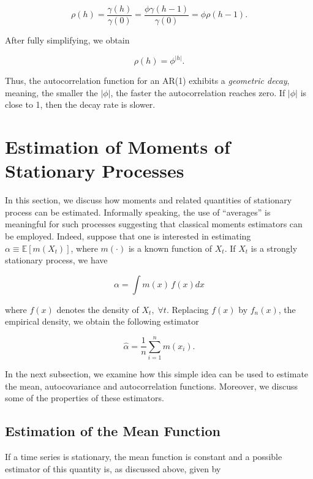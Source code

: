 \documentclass[]{book}
\theoremstyle{definition}
\theoremstyle{definition}
\theoremstyle{definition}
\theoremstyle{remark}
\begin{document}
\[\rho \left( h \right) = \frac{{\gamma \left( h \right)}}{{\gamma \left( 0 \right)}} = \frac{{\phi \gamma \left( {h - 1} \right)}}{{\gamma \left( 0 \right)}} = \phi \rho \left( {h - 1} \right).\]

After fully simplifying, we obtain

\[\rho \left( h \right) = {\phi^{|h|}}.\]

Thus, the autocorrelation function for an AR(1) exhibits a
\emph{geometric decay}, meaning, the smaller the \(|\phi|\), the faster
the autocorrelation reaches zero. If \(|\phi|\) is close to 1, then the
decay rate is slower.

\hypertarget{estimation-of-moments-of-stationary-processes}{%
\section{Estimation of Moments of Stationary
Processes}\label{estimation-of-moments-of-stationary-processes}}

In this section, we discuss how moments and related quantities of
stationary process can be estimated. Informally speaking, the use of
``averages'' is meaningful for such processes suggesting that classical
moments estimators can be employed. Indeed, suppose that one is
interested in estimating \(\alpha \equiv \mathbb{E}[m (X_t)]\), where
\(m(\cdot)\) is a known function of \(X_t\). If \(X_t\) is a strongly
stationary process, we have

\[\alpha = \int m(x) \, f(x) dx\]

where \(f(x)\) denotes the density of \(X_t, \; \forall t\). Replacing
\(f(x)\) by \(f_n(x)\), the empirical density, we obtain the following
estimator

\[\hat{\alpha} = \frac{1}{n} \sum_{i = 1}^n m\left(x_i\right).\]

In the next subsection, we examine how this simple idea can be used to
estimate the mean, autocovariance and autocorrelation functions.
Moreover, we discuss some of the properties of these estimators.

\hypertarget{estimation-of-the-mean-function}{%
\subsection{Estimation of the Mean
Function}\label{estimation-of-the-mean-function}}

If a time series is stationary, the mean function is constant and a
possible estimator of this quantity is, as discussed above, given by
\end{document}
